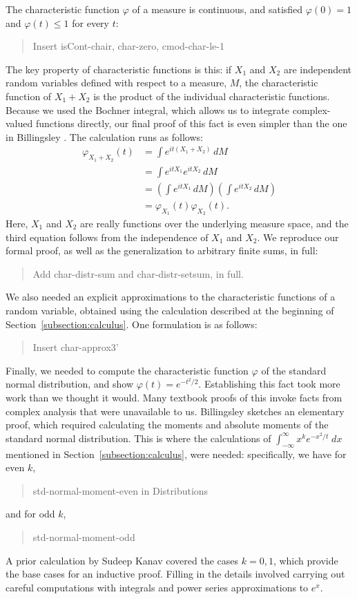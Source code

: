 \documentclass{svjour3}
\newcommand{\todo}[1]{{\color{red}#1}}
\newcommand{\ph}{\varphi}
\begin{document}
The characteristic function $\ph$ of a measure is continuous, and satisfied $\ph(0) = 1$ and $\ph(t) \leq 1$ for every $t$:
\begin{quote}
 \todo{Insert isCont-chair, char-zero, cmod-char-le-1}
\end{quote}
The key property of characteristic functions is this: if $X_1$ and $X_2$ are independent random variables defined with respect to a measure, $M$, the characteristic function of $X_1 + X_2$ is the product of the individual characteristic functions. Because we used the Bochner integral, which allows us to integrate complex-valued functions directly, our final proof of this fact is even simpler than the one in Billingsley \cite{billingsley:95}. The calculation runs as follows:
\begin{align*}
\ph_{X_1 + X_2}(t) &= \int e^{i t (X_1 + X_2)} \, dM  \\
                   &= \int e^{i t X_1} e^{i t X_2} \, dM \\
                   &= \left(\int e^{i t X_1} \, dM\right) \left(\int e^{i t X_2} \, dM\right) \\
                   &= \ph_{X_1}(t) \ph_{X_2}(t).
\end{align*}
Here, $X_1$ and $X_2$ are really functions over the underlying measure space, and the third equation follows from the independence of $X_1$ and $X_2$. We reproduce our formal proof, as well as the generalization to arbitrary finite sums, in full:
\begin{quote}
\todo{Add char-distr-sum and char-distr-setsum, in full.}
\end{quote}
We also needed an explicit approximations to the characteristic functions of a random variable, obtained using the calculation described at the beginning of Section~\ref{subsection:calculus}. One formulation is as follows:
\begin{quote}
 \todo{Insert char-approx3'}
\end{quote}

Finally, we needed to compute the characteristic function $\ph$ of the standard normal distribution, and show $\ph(t) = e^{-t^2/2}$. Establishing this fact took more work than we thought it would. Many textbook proofs of this invoke facts from complex analysis that were unavailable to us. Billingsley \cite[page 344]{billingsley:95} sketches an elementary proof, which required calculating the moments and absolute moments of the standard normal distribution. This is where the calculations of $\int_{-\infty}^\infty x^k e^{-x^2 / t} \; dx$ mentioned in Section~\ref{subsection:calculus}, were needed: specifically, we have for even $k$, 
\begin{quote}
\todo{std-normal-moment-even in Distributions}
\end{quote}
and for odd $k$,
\begin{quote}
\todo{std-normal-moment-odd}
\end{quote}
A prior calculation by Sudeep Kanav covered the cases $k = 0, 1$, which provide the base cases for an inductive proof. Filling in the details involved carrying out careful computations with integrals and power series approximations to $e^x$.
\end{document}
